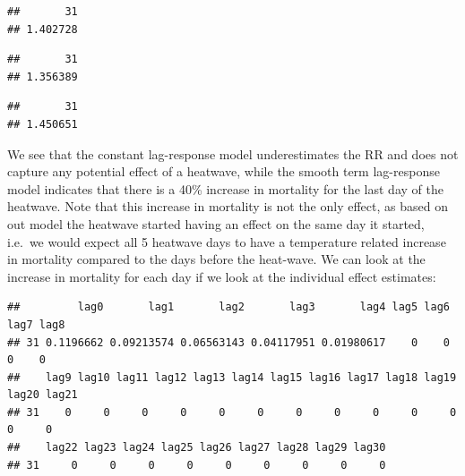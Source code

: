 \documentclass[
]{book}
\newenvironment{Shaded}{\begin{snugshade}}{\end{snugshade}}
\newcommand{\CommentTok}[1]{\textcolor[rgb]{0.56,0.35,0.01}{\textit{#1}}}
\newcommand{\NormalTok}[1]{#1}
\newcommand{\OperatorTok}[1]{\textcolor[rgb]{0.81,0.36,0.00}{\textbf{#1}}}
\begin{document}
\begin{verbatim}
##       31 
## 1.402728
\end{verbatim}

\begin{Shaded}
\end{Shaded}

\begin{verbatim}
##       31 
## 1.356389
\end{verbatim}

\begin{Shaded}
\end{Shaded}

\begin{verbatim}
##       31 
## 1.450651
\end{verbatim}

We see that the constant lag-response model underestimates the RR and does not capture any potential effect of a heatwave, while the smooth term lag-response model indicates that there is a 40\% increase in mortality for the last day of the heatwave. Note that this increase in mortality is not the only effect, as based on out model the heatwave started having an effect on the same day it started, i.e.~we would expect all 5 heatwave days to have a temperature related increase in mortality compared to the days before the heat-wave. We can look at the increase in mortality for each day if we look at the individual effect estimates:

\begin{Shaded}
\end{Shaded}

\begin{verbatim}
##         lag0       lag1       lag2       lag3       lag4 lag5 lag6 lag7 lag8
## 31 0.1196662 0.09213574 0.06563143 0.04117951 0.01980617    0    0    0    0
##    lag9 lag10 lag11 lag12 lag13 lag14 lag15 lag16 lag17 lag18 lag19 lag20 lag21
## 31    0     0     0     0     0     0     0     0     0     0     0     0     0
##    lag22 lag23 lag24 lag25 lag26 lag27 lag28 lag29 lag30
## 31     0     0     0     0     0     0     0     0     0
\end{verbatim}
\end{document}
